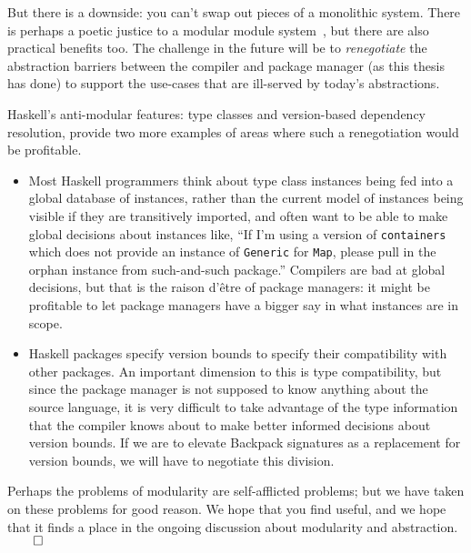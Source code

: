 But there is a downside: you can't swap out pieces of a monolithic
system.  There is perhaps a poetic justice to a modular module
system~\cite{leroy:modular}, but there are also practical benefits too.
The challenge in the future will be to \emph{renegotiate} the abstraction
barriers between the compiler and package manager (as this thesis has done)
to support the use-cases that are ill-served by today's abstractions.

Haskell's anti-modular features: type classes and version-based dependency
resolution, provide two more examples of areas where such a renegotiation would
be profitable.

\begin{itemize}
    \item Most Haskell programmers think about type class instances being
    fed into a global database of instances, rather than the current model
    of instances being visible if they are transitively imported, and often
    want to be able to make global decisions about instances like, ``If I'm
    using a version of \verb|containers| which does not provide an instance
    of \verb|Generic| for \verb|Map|, please pull in the orphan instance from
    such-and-such package.''  Compilers are bad at global decisions, but
    that is the raison d'\^etre of package managers:
    it might be profitable to let package managers have a bigger say in
    what instances are in scope.

    \item Haskell packages specify version bounds to specify their compatibility
    with other packages.  An important dimension to this is type compatibility,
    but since the package manager is not supposed to know anything about
    the source language, it is very difficult to take advantage of the type information
    that the compiler knows about to make better informed decisions about version
    bounds.  If we are to elevate Backpack signatures as a replacement for
    version bounds, we will have to negotiate this division.
\end{itemize}
%
Perhaps the problems of modularity are self-afflicted problems; but we have
taken on these problems for good reason.  We hope that you find \Backpack{}
useful, and we hope that it finds a place in the
ongoing discussion about modularity and abstraction. $\qed$
